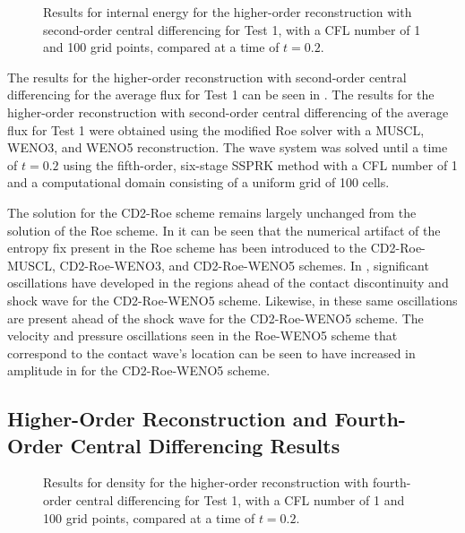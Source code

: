 \begin{figure}
	\caption[Results for internal energy for the higher-order reconstruction with second-order central differencing for Test 1, with a CFL number of 1 and 100 grid points, compared at a time of $t=0.2$.]{Results for internal energy for the higher-order reconstruction with second-order central differencing for Test 1, with a CFL number of 1 and 100 grid points, compared at a time of $t=0.2$.}
	\label{fig:Test1HORCD2energy}
\end{figure}
The results for the higher-order reconstruction with second-order central differencing for the average flux for Test 1 can be seen in . The results for the higher-order reconstruction with second-order central differencing of the average flux for Test 1 were obtained using the modified Roe solver with a MUSCL, WENO3, and WENO5 reconstruction. The wave system was solved until a time of $t=0.2$ using the fifth-order, six-stage SSPRK method with a CFL number of 1 and a computational domain consisting of a uniform grid of 100 cells.

The solution for the CD2-Roe scheme remains largely unchanged from the solution of the Roe scheme. In  it can be seen that the numerical artifact of the entropy fix present in the Roe scheme has been introduced to the CD2-Roe-MUSCL, CD2-Roe-WENO3, and CD2-Roe-WENO5 schemes. In , significant oscillations have developed in the regions ahead of the contact discontinuity and shock wave for the CD2-Roe-WENO5 scheme. Likewise, in  these same oscillations are present ahead of the shock wave for the CD2-Roe-WENO5 scheme. The velocity and pressure oscillations seen in the Roe-WENO5 scheme that correspond to the contact wave's location can be seen to have increased in amplitude in   for the CD2-Roe-WENO5 scheme.


\subsection{Higher-Order Reconstruction and Fourth-Order Central Differencing Results}
\begin{figure}
	\caption[Results for density for the higher-order reconstruction with fourth-order central differencing for Test 1, with a CFL number of 1 and 100 grid points, compared at a time of $t=0.2$.]{Results for density for the higher-order reconstruction with fourth-order central differencing for Test 1, with a CFL number of 1 and 100 grid points, compared at a time of $t=0.2$.}
	\label{fig:Test1HORCD4density}
\end{figure}

